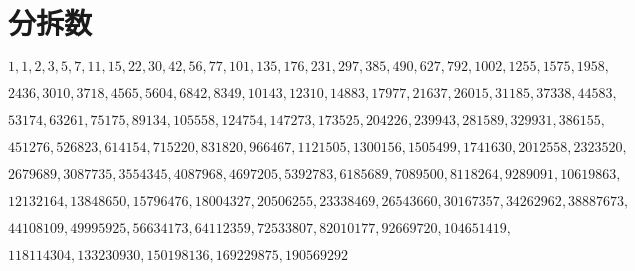 \section{分拆数}

$1,1,2,3,5,7,11,15,22,30,42,56,77,101,135,176,231,297,385,490,627,792,1002,1255,1575,1958,$

$2436,3010,3718,4565,5604,6842,8349,10143,12310,14883,17977,21637,26015,31185,37338,44583,$

$53174,63261,75175,89134,105558,124754,147273,173525,204226,239943,281589,329931,386155,$

$451276,526823,614154,715220,831820,966467,1121505,1300156,1505499,1741630,2012558,2323520,$

$2679689,3087735,3554345,4087968,4697205,5392783,6185689,7089500,8118264,9289091,10619863,$

$12132164,13848650,15796476,18004327,20506255,23338469,26543660,30167357,34262962,38887673,$

$44108109,49995925,56634173,64112359,72533807,82010177,92669720,104651419,$

$118114304,133230930,150198136,169229875,190569292$